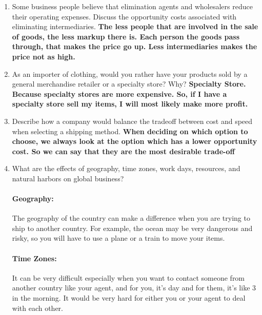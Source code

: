 \begin{enumerate}
  \item Some business people believe that elimination agents and wholesalers
    reduce their operating expenses. Discuss the opportunity costs associated
    with eliminating intermediaries.
      \bf{The less people that are involved in the sale of goods, the less
      markup there is. Each person the goods pass through, that makes the price
      go up. Less intermediaries makes the price not as high.}
  \item As an importer of clothing, would you rather have your products sold by
    a general merchandise retailer or a specialty store? Why?
      \bf{Specialty Store. Because specialty stores are more expensive. So, if I
      have a specialty store sell my items, I will most likely make more profit.}
  \item Describe how a company would balance the tradeoff between cost and speed
    when selecting a shipping method.
      \bf{When deciding on which option to choose, we always look at the option
      which has a lower opportunity cost. So we can say that they are the most
    desirable trade-off}
  \item What are the effects of geography, time zones, work days, resources, and
    natural harbors on global business?
      \paragraph{Geography:} The geography of the country can make a difference
        when you are trying to ship to another country. For example, the ocean may
        be very dangerous and risky, so you will have to use a plane or a train to
        move your items.
      \paragraph{Time Zones:} It can be very difficult especially when you want
        to contact someone from another country like your agent, and for you, it's
        day and for them, it's like 3 in the morning. It would be very hard for
        either you or your agent to deal with each other.
\end{enumerate}

